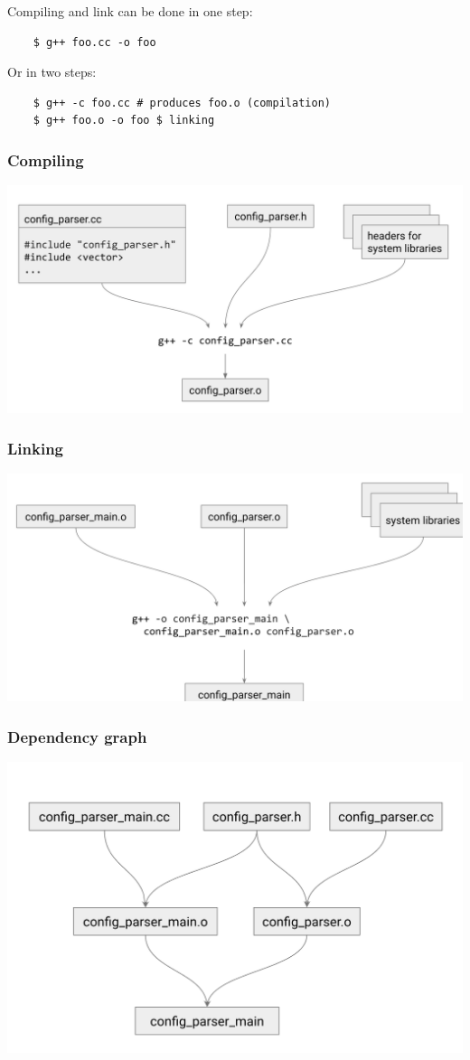 \documentclass{article}
\begin{document}
Compiling and link can be done in one step:
\begin{verbatim}
    $ g++ foo.cc -o foo
\end{verbatim}

Or in two steps:
\begin{verbatim}
    $ g++ -c foo.cc # produces foo.o (compilation)
    $ g++ foo.o -o foo $ linking
\end{verbatim}

\subsubsection*{Compiling}

\begin{center}
    \includegraphics*[width=0.7\linewidth]{compilation.png}
\end{center}

\subsubsection*{Linking}

\begin{center}
    \includegraphics*[width=0.7\linewidth]{linking.png}
\end{center}

\subsubsection*{Dependency graph}

\begin{center}
    \includegraphics*[width=0.7\linewidth]{dependencyGraph.png}
\end{center}
\end{document}

